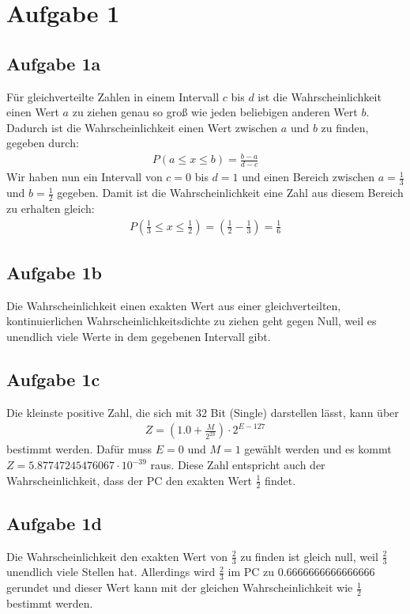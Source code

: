 \section*{Aufgabe 1}
\subsection*{Aufgabe 1a}
Für gleichverteilte Zahlen in einem Intervall $c$ bis $d$ ist die Wahrscheinlichkeit einen Wert $a$ zu ziehen genau so groß wie jeden beliebigen anderen Wert $b$. Dadurch ist die Wahrscheinlichkeit einen Wert zwischen $a$ und $b$ zu finden, gegeben durch:
\begin{align*}
  P(a \le x\le b) = \frac{b - a}{d - c}
\end{align*}
Wir haben nun ein Intervall von $c = 0$ bis $d = 1$ und einen Bereich zwischen $a = \frac{1}{3}$ und $b = \frac{1}{2}$ gegeben. Damit ist die Wahrscheinlichkeit eine Zahl aus diesem Bereich zu erhalten gleich:
\begin{align*}
  P\left(\frac{1}{3}\le x\le\frac{1}{2} \right) = \left(\frac{1}{2} - \frac{1}{3}\right) = \frac{1}{6}
\end{align*}

\subsection*{Aufgabe 1b}
Die Wahrscheinlichkeit einen exakten Wert aus einer gleichverteilten, kontinuierlichen Wahrscheinlichkeitsdichte zu ziehen geht gegen Null, weil es unendlich viele Werte in dem gegebenen Intervall gibt.

\subsection*{Aufgabe 1c}
Die kleinste positive Zahl, die sich mit 32 Bit (Single) darstellen lässt, kann über
\begin{align*}
  Z = \left(1.0 + \frac{M}{2^{23}}\right)\cdot 2^{E-127}
\end{align*}
bestimmt werden. Dafür muss $E = 0$ und $M = 1$ gewählt werden und es kommt $Z = 5.87747245476067 \cdot 10^{-39}$ raus. Diese Zahl entspricht auch der Wahrscheinlichkeit, dass der PC den exakten Wert $\frac{1}{2}$ findet.

\subsection*{Aufgabe 1d}
Die Wahrscheinlichkeit den exakten Wert von $\frac{2}{3}$ zu finden ist gleich null, weil $\frac{2}{3}$ unendlich viele Stellen hat. Allerdings wird $\frac{2}{3}$ im PC zu 0.6666666666666666 gerundet und dieser Wert kann mit der gleichen Wahrscheinlichkeit wie $\frac{1}{2}$ bestimmt werden.

